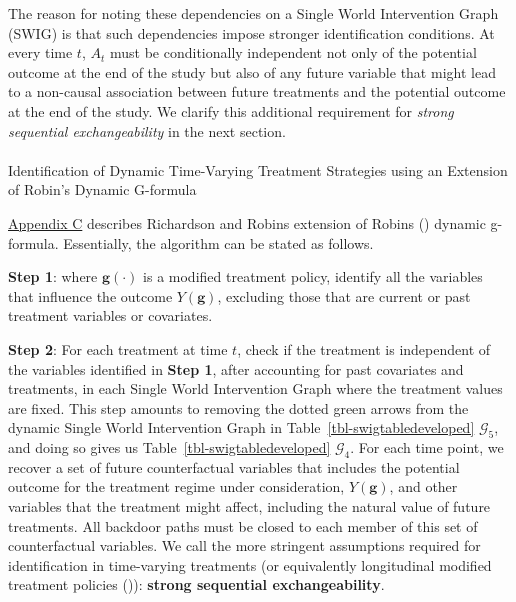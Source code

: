 \documentclass[
  single column]{article}
\makeatletter
\let\oldparagraph\paragraph
\renewcommand{\paragraph}{
    \@ifstar
      \xxxParagraphStar
      \xxxParagraphNoStar
  }
\newcommand{\xxxParagraphStar}[1]{\oldparagraph*{#1}\mbox{}}
\newcommand{\xxxParagraphNoStar}[1]{\oldparagraph{#1}\mbox{}}
\makeatother
\begin{document}
The reason for noting these dependencies on a Single World Intervention
Graph (SWIG) is that such dependencies impose stronger identification
conditions. At every time \(t\), \(A_t\) must be conditionally
independent not only of the potential outcome at the end of the study
but also of any future variable that might lead to a non-causal
association between future treatments and the potential outcome at the
end of the study. We clarify this additional requirement for
\emph{strong sequential exchangeability} in the next section.

\paragraph{Identification of Dynamic Time-Varying Treatment Strategies
using an Extension of Robin's Dynamic
G-formula}\label{identification-of-dynamic-time-varying-treatment-strategies-using-an-extension-of-robins-dynamic-g-formula}

\hyperref[id-app-c]{Appendix C} describes Richardson and Robins
extension of Robins () dynamic g-formula.
Essentially, the algorithm can be stated as follows.

\textbf{Step 1}: where \(\mathbf{g}(\cdot)\) is a modified treatment
policy, identify all the variables that influence the outcome
\(Y(\mathbf{g})\), excluding those that are current or past treatment
variables or covariates.

\textbf{Step 2}: For each treatment at time \(t\), check if the
treatment is independent of the variables identified in \textbf{Step 1},
after accounting for past covariates and treatments, in each Single
World Intervention Graph where the treatment values are fixed. This step
amounts to removing the dotted green arrows from the dynamic Single
World Intervention Graph in Table~\ref{tbl-swigtabledeveloped}
\(\mathcal{G}_5\), and doing so gives us
Table~\ref{tbl-swigtabledeveloped} \(\mathcal{G}_4\). For each time
point, we recover a set of future counterfactual variables that includes
the potential outcome for the treatment regime under consideration,
\(Y(\mathbf{g})\), and other variables that the treatment might affect,
including the natural value of future treatments. All backdoor paths
must be closed to each member of this set of counterfactual variables.
We call the more stringent assumptions required for identification in
time-varying treatments (or equivalently longitudinal modified treatment
policies ()):
\textbf{strong sequential exchangeability}.
\end{document}
